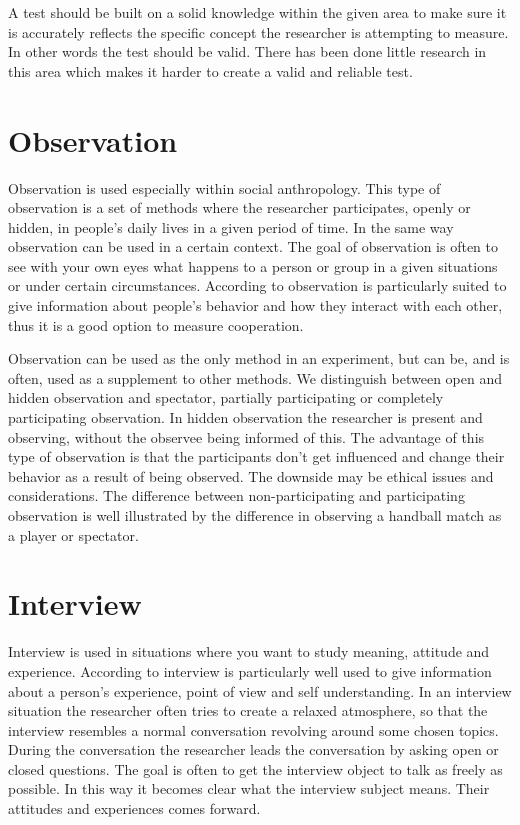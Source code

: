 \bigskip\noindent
A test should be built on a solid knowledge within the given area to make sure it is accurately reflects the specific concept the researcher is attempting to measure. In other words the test should be valid. There has been done little research in this area which makes it harder to create a valid and reliable test.

\section{Observation}
Observation is used especially within social anthropology. This type of observation is a set of methods where the researcher participates, openly or hidden, in people's daily lives in a given period of time\cite{tjora2012kvalitative}. In the same way observation can be used in a certain context. The goal of observation is often to see with your own eyes what happens to a person or group in a given situations or under certain circumstances. According to \cite{thagaard2003systematikk} observation is particularly suited to give information about people's behavior and how they interact with each other, thus it is a good option to measure cooperation. 

\bigskip\noindent
Observation can be used as the only method in an experiment, but can be, and is often, used as a supplement to other methods. We distinguish between open and hidden observation and spectator, partially participating or completely participating observation. In hidden observation the researcher is present and observing, without the observee being informed of this. The advantage of this type of observation is that the participants don't get influenced and change their behavior as a result of being observed. The downside may be ethical issues and considerations. The difference between non-participating and participating observation is well illustrated by the difference in observing a handball match as a player or spectator. 

\section{Interview}
Interview is used in situations where you want to study meaning, attitude and experience\cite{tjora2012kvalitative}. According to \cite{thagaard2003systematikk} interview is particularly well used to give information about a person's experience, point of view and self understanding. In an interview situation the researcher often tries to create a relaxed atmosphere, so that the interview resembles a normal conversation revolving around some chosen topics. During the conversation the researcher leads the conversation by asking open or closed questions. The goal is often to get the interview object to talk as freely as possible. In this way it becomes clear what the interview subject means. Their attitudes and experiences comes forward. 

